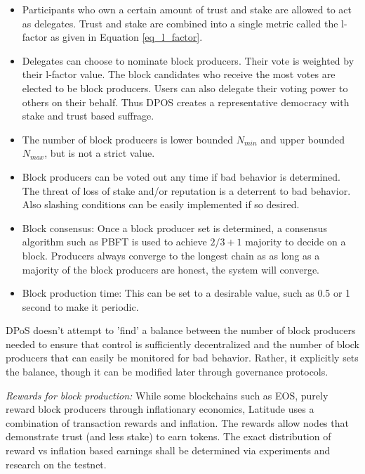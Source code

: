 \begin{itemize}
\item Participants who own a certain amount of trust and stake are allowed to act as delegates. Trust and stake are
    combined into a single metric called the l-factor as given in Equation \ref{eq_l_factor}.
\item Delegates can choose to nominate block producers. Their vote is weighted by their l-factor value. The block
    candidates who receive the most votes are elected to be block producers. Users can also delegate their voting power
        to others on their behalf. Thus DPOS creates a representative democracy with stake and trust based suffrage.
\item The number of block producers is lower bounded $N_{min}$ and upper bounded $N_{max}$, but is not a strict value.

\item Block producers can be voted out any time if bad behavior is determined. The threat of loss of stake and/or
    reputation is a deterrent to bad behavior. Also slashing conditions can be easily implemented if so desired.
\item Block consensus: Once a block producer set is determined, a consensus algorithm such as PBFT is used to
    achieve $2/3 +1$ majority to decide on a block. Producers always converge to the longest chain as as long as a
        majority of the block producers are honest, the system will converge.
\item Block production time: This can be set to a desirable value, such as 0.5 or 1 second to make it periodic.
\end{itemize}

DPoS doesn't attempt to 'find' a balance between the number of block producers needed to ensure that control is
sufficiently decentralized and the number of block producers that can easily be monitored for bad behavior. Rather, it
explicitly sets the balance, though it can be modified later through governance protocols.

\noindent
{\em Rewards for block production:} While some blockchains such as EOS, purely reward block producers through inflationary
economics, Latitude uses a combination of transaction rewards and inflation. The rewards allow nodes that demonstrate
trust (and less stake) to earn tokens. The exact distribution of reward vs inflation based earnings shall be determined
via experiments and research on the testnet.


